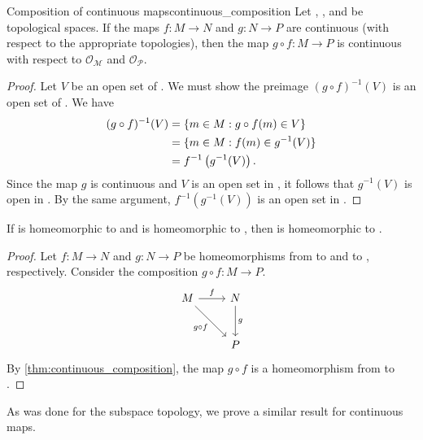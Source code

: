 \begin{theorem}{Composition of continuous maps}{continuous_composition}
    Let , , and  be topological spaces. If the maps \(f: M \to N\) and \(g : N \to P\) are continuous (with respect to the appropriate topologies), then the map \(g \circ f : M \to P\) is continuous with respect to \(\mathcal{O_M}\) and \(\mathcal{O_P}\).
\end{theorem}
\begin{proof}
    Let \(V\) be an open set of . We must show the preimage \((g \circ f)^{-1}(V)\) is an open set of . We have
    \begin{align*}
        (g\circ f)^{-1}(V) &= \{m \in M : g\circ f(m) \in V\}\\
                           &= \{m \in M : f(m) \in g^{-1}(V)\}\\
                           &= f^{-1}\left(g^{-1}(V)\right).
    \end{align*}
    Since the map \(g\) is continuous and \(V\) is an open set in , it follows that \(g^{-1}(V)\) is open in . By the same argument, \(f^{-1}\left(g^{-1}(V)\right)\) is an open set in .
\end{proof}

\begin{corollary}
    If  is homeomorphic to  and  is homeomorphic to , then  is homeomorphic to .
\end{corollary}
\begin{proof}
    Let \(f : M \to N\) and \(g : N \to P\) be homeomorphisms from  to  and  to , respectively. Consider the composition \(g\circ f : M \to P\).
    \begin{equation*}
        \begin{tikzcd}[column sep = normal, row sep = large]
            M \arrow{r}{f} \arrow[swap]{dr}{g\circ f} & N \arrow{d}{g} \\
                                                      & P
        \end{tikzcd}
    \end{equation*}
    By \cref{thm:continuous_composition}, the map \(g\circ f\) is a homeomorphism from  to .
\end{proof}

As was done for the subspace topology, we prove a similar result for continuous maps.

